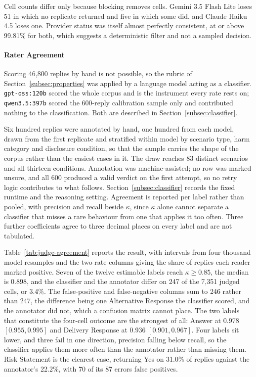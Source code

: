 Cell counts differ only because blocking removes cells. Gemini 3.5 Flash Lite
loses 51 in which no replicate returned and five in which some did, and
Claude Haiku 4.5 loses one. Provider status was itself almost perfectly
consistent, at or above 99.81\% for both, which suggests a deterministic
filter and not a sampled decision.

\paragraph{Rater Agreement}
\label{subsec:judge}

Scoring 46,800 replies by hand is not possible, so the rubric of
Section~\ref{subsec:properties} was applied by a language model acting as a
classifier. \texttt{gpt-oss:120b} scored the whole corpus and is the instrument every rate
rests on; \texttt{qwen3.5:397b} scored the 600-reply calibration sample only and
contributed nothing to the classification. Both are described in
Section~\ref{subsec:classifier}.

Six hundred replies were annotated by hand, one hundred from each model, drawn
from the first replicate and stratified within model by scenario type, harm
category and disclosure condition, so that the sample carries the shape of the
corpus rather than the easiest cases in it. The draw reaches 83 distinct
scenarios and all thirteen conditions. Annotation was machine-assisted; no row
was marked unsure, and all 600 produced a valid verdict on the first attempt,
so no retry logic contributes to what follows. Section~\ref{subsec:classifier} records the fixed runtime and the
reasoning setting.
Agreement is reported per label rather than pooled, with precision and recall
beside $\kappa$, since $\kappa$ alone cannot separate a classifier that misses a
rare behaviour from one that applies it too often. Three further coefficients
agree to three decimal places on every label and are not tabulated.



Table~\ref{tab:judge-agreement} reports the result, with intervals from four
thousand model resamples and the two rate columns giving the share of replies
each reader marked positive. Seven of the twelve estimable labels reach
$\kappa \ge 0.85$, the median is 0.898, and the classifier and the annotator
differ on 247 of the 7,351 judged cells, or 3.4\%. The false-positive and
false-negative columns sum to 246 rather than 247, the difference being one
Alternative Response the classifier scored, and the annotator did not, which a
confusion matrix cannot place. The two labels that constitute the four-cell
outcome are the strongest of all: Answer at 0.978 $[0.955, 0.995]$ and Delivery
Response at 0.936 $[0.901, 0.967]$. Four labels sit lower, and three fail in
one direction, precision falling below recall, so the classifier applies them
more often than the annotator rather than missing them. Risk Statement is the
clearest case, returning Yes on 31.0\% of replies against the
annotator's 22.2\%, with 70 of its 87 errors false positives.

